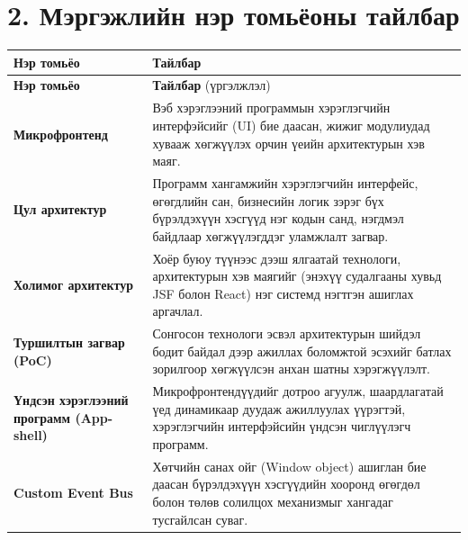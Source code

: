 \section*{2. Мэргэжлийн нэр томьёоны тайлбар}
\renewcommand{\arraystretch}{1}
\begin{longtable}{p{4.5cm} p{10.5cm}}
\toprule
\textbf{Нэр томьёо} & \textbf{Тайлбар} \\ 
\midrule
\endfirsthead
\toprule
\textbf{Нэр томьёо} & \textbf{Тайлбар} (үргэлжлэл) \\ 
\midrule
\endhead
\bottomrule
\endfoot

\textbf{Микрофронтенд} & Вэб хэрэглээний программын хэрэглэгчийн интерфэйсийг (UI) бие даасан, жижиг модулиудад хувааж хөгжүүлэх орчин үеийн архитектурын хэв маяг. \\ 
\textbf{Цул архитектур} & Программ хангамжийн хэрэглэгчийн интерфейс, өгөгдлийн сан, бизнесийн логик зэрэг бүх бүрэлдэхүүн хэсгүүд нэг кодын санд, нэгдмэл байдлаар хөгжүүлэгддэг уламжлалт загвар. \\ 
\textbf{Холимог архитектур} & Хоёр буюу түүнээс дээш ялгаатай технологи, архитектурын хэв маягийг (энэхүү судалгааны хувьд JSF болон React) нэг системд нэгтгэн ашиглах аргачлал. \\ 
\textbf{Туршилтын загвар (PoC)} & Сонгосон технологи эсвэл архитектурын шийдэл бодит байдал дээр ажиллах боломжтой эсэхийг батлах зорилгоор хөгжүүлсэн анхан шатны хэрэгжүүлэлт. \\ 
\textbf{Үндсэн хэрэглээний программ (App-shell)} & Микрофронтендүүдийг дотроо агуулж, шаардлагатай үед динамикаар дуудаж ажиллуулах үүрэгтэй, хэрэглэгчийн интерфэйсийн үндсэн чиглүүлэгч программ. \\ 
\textbf{Custom Event Bus} & Хөтчийн санах ойг (Window object) ашиглан бие даасан бүрэлдэхүүн хэсгүүдийн хооронд өгөгдөл болон төлөв солилцох механизмыг хангадаг тусгайлсан суваг. \\ 

\end{longtable}

\newpage
